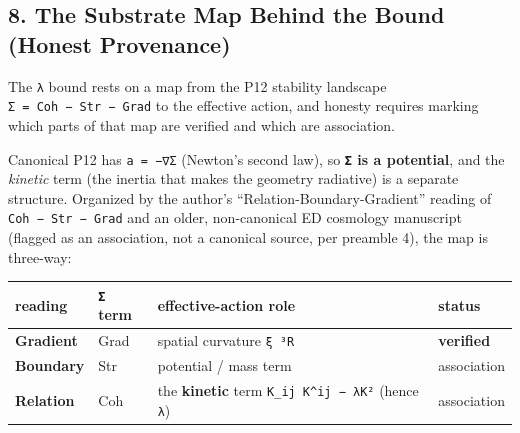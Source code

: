 \documentclass[
]{article}
\newcounter{none} %
\begin{document}
\subsection{8. The Substrate Map Behind the Bound (Honest
Provenance)}\label{the-substrate-map-behind-the-bound-honest-provenance}

The \texttt{λ} bound rests on a map from the P12 stability landscape
\texttt{Σ\ =\ Coh\ −\ Str\ −\ Grad} to the effective action, and honesty
requires marking which parts of that map are verified and which are
association.

Canonical P12 has \texttt{a\ =\ −∇Σ} (Newton's second law), so
\textbf{\texttt{Σ} is a potential}, and the \emph{kinetic} term (the
inertia that makes the geometry radiative) is a separate structure.
Organized by the author's ``Relation-Boundary-Gradient'' reading of
\texttt{Coh\ −\ Str\ −\ Grad} and an older, non-canonical ED cosmology
manuscript (flagged as an association, not a canonical source, per
preamble 4), the map is three-way:

{\def\LTcaptype{none} %
\begin{longtable}[]{@{}
  >{\raggedright\arraybackslash}p{}
  >{\raggedright\arraybackslash}p{}
  >{\raggedright\arraybackslash}p{}
  >{\raggedright\arraybackslash}p{}@{}}
\toprule\noalign{}
\begin{minipage}[b]{\linewidth}\raggedright
reading
\end{minipage} & \begin{minipage}[b]{\linewidth}\raggedright
\texttt{Σ} term
\end{minipage} & \begin{minipage}[b]{\linewidth}\raggedright
effective-action role
\end{minipage} & \begin{minipage}[b]{\linewidth}\raggedright
status
\end{minipage} \\
\midrule\noalign{}
\endhead
\bottomrule\noalign{}
\endlastfoot
\textbf{Gradient} & Grad & spatial curvature \texttt{ξ\ ³R} &
\textbf{verified} \\
\textbf{Boundary} & Str & potential / mass term & association \\
\textbf{Relation} & Coh & the \textbf{kinetic} term
\texttt{K\_ij\ K\^{}ij\ −\ λK²} (hence \texttt{λ}) & association \\
\end{longtable}
}
\end{document}

